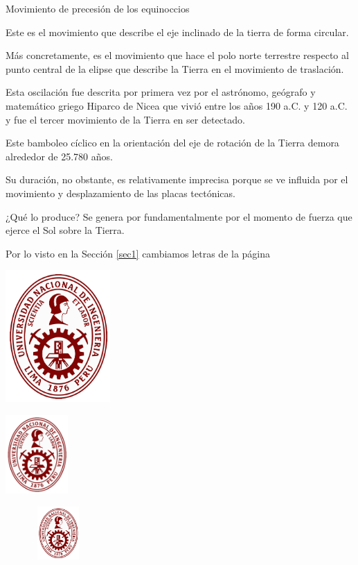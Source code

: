 \documentclass[12pt,a4paper]{article}
\begin{document}
Movimiento de precesión de los equinoccios

Este es el movimiento que describe el eje inclinado de la tierra de forma circular.

Más concretamente, es el movimiento que hace el polo norte terrestre respecto al punto central de la elipse 
que describe la Tierra en el movimiento de traslación.

Esta oscilación fue descrita por primera vez por el astrónomo, geógrafo y matemático griego Hiparco de Nicea 
que vivió entre los años 190 a.C. y 120 a.C. y fue el tercer movimiento de la Tierra en ser detectado.

Este bamboleo cíclico en la orientación del eje de rotación de la Tierra demora alrededor de 25.780 años. 

Su duración, no obstante, es relativamente imprecisa porque se ve influida por el movimiento y desplazamiento 
de las placas tectónicas.

¿Qué lo produce? Se genera por fundamentalmente por el momento de fuerza que ejerce el Sol sobre la Tierra.	

Por lo visto en la Sección \ref{sec1} cambiamos letras de la página \pageref{sec1}


\newpage

\includegraphics[width=4cm]{uni}

\includegraphics[height=3cm]{uni}

\includegraphics[width=4cm,height=2cm]{uni}
\end{document}
